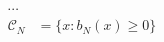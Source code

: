 \documentclass[preview]{standalone}
\begin{document}
\begin{align*}
\cdots\\ \mathcal{C}_N &= \{ x : b_N(x) \geq 0 \}
\end{align*}
\end{document}
